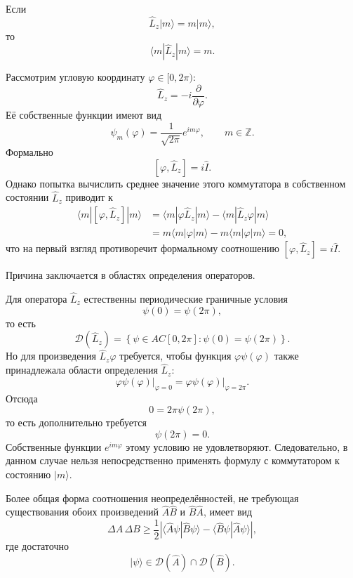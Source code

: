 \documentclass[12pt,a4paper]{article}
\begin{document}
Если
\[
    \hat L_z|m\rangle=m|m\rangle,
\]
то
\[
    \langle m|\hat L_z|m\rangle=m.
\]

Рассмотрим угловую координату $\varphi\in[0,2\pi)$:
\[
    \hat L_z
    =
    -i\frac{\partial}{\partial\varphi}.
\]
Её собственные функции имеют вид
\[
    \boxed{
        \psi_m(\varphi)
        =
        \frac{1}{\sqrt{2\pi}}e^{im\varphi},
        \qquad
        m\in\mathbb Z
    }.
\]
Формально
\[
    [\varphi,\hat L_z]=i\hat I.
\]
Однако попытка вычислить среднее значение этого коммутатора в
собственном состоянии $\hat L_z$ приводит к
\begin{align*}
    \langle m|[\varphi,\hat L_z]|m\rangle
    &=
    \langle m|\varphi\hat L_z|m\rangle
    -
    \langle m|\hat L_z\varphi|m\rangle
    \\
    &=
    m\langle m|\varphi|m\rangle
    -
    m\langle m|\varphi|m\rangle
    =0,
\end{align*}
что на первый взгляд противоречит формальному соотношению
$[\varphi,\hat L_z]=i\hat I$.

Причина заключается в областях определения операторов.

Для оператора $\hat L_z$ естественны периодические граничные условия
\[
    \psi(0)=\psi(2\pi),
\]
то есть
\[
    \mathcal D(\hat L_z)
    =
    \left\{
        \psi\in AC[0,2\pi]:
        \psi(0)=\psi(2\pi)
    \right\}.
\]
Но для произведения $\hat L_z\varphi$ требуется, чтобы функция
$\varphi\psi(\varphi)$ также принадлежала области определения
$\hat L_z$:
\[
    \left.
        \varphi\psi(\varphi)
    \right|_{\varphi=0}
    =
    \left.
        \varphi\psi(\varphi)
    \right|_{\varphi=2\pi}.
\]
Отсюда
\[
    0
    =
    2\pi\psi(2\pi),
\]
то есть дополнительно требуется
\[
    \psi(2\pi)=0.
\]
Собственные функции $e^{im\varphi}$ этому условию не удовлетворяют.
Следовательно, в данном случае нельзя непосредственно применять
формулу с коммутатором к состоянию $|m\rangle$.

Более общая форма соотношения неопределённостей, не требующая
существования обоих произведений $\hat A\hat B$ и $\hat B\hat A$,
имеет вид
\[
    \boxed{
    \Delta A\,\Delta B
    \geq
    \frac12
    \left|
        \langle\hat A\psi|\hat B\psi\rangle
        -
        \langle\hat B\psi|\hat A\psi\rangle
    \right|
    },
\]
где достаточно
\[
    |\psi\rangle
    \in
    \mathcal D(\hat A)\cap\mathcal D(\hat B).
\]
\end{document}
